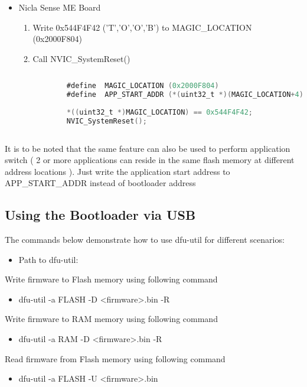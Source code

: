 \documentclass{article}
\begin{document}
\begin{itemize}
	\item Nicla Sense ME Board
	\begin{enumerate}[label=\roman*.]
		\item Write 0x544F4F42 ('T','O','O','B') to MAGIC\_LOCATION (0x2000F804)
		\item Call NVIC\_SystemReset()
		\begin{lstlisting}[language=C]
		
		#define  MAGIC_LOCATION (0x2000F804)
		#define  APP_START_ADDR (*(uint32_t *)(MAGIC_LOCATION+4)
		 
		*((uint32_t *)MAGIC_LOCATION) == 0x544F4F42;
		NVIC_SystemReset();
		
		\end{lstlisting}
	\end{enumerate}
\end{itemize}
It is to be noted that the same feature can also be used to perform application switch ( 2 or more applications can reside in the same flash memory at different address locations ). Just write the application start address to APP\_START\_ADDR instead of bootloader address
\subsection{Using the Bootloader via USB}
The commands below demonstrate how to use dfu-util for different scenarios:

\begin{itemize}
	\item Path to dfu-util: 
\end{itemize}

Write firmware to Flash memory using following command
\begin{itemize}
	\item dfu-util -a FLASH -D <firmware>.bin -R
\end{itemize}

Write firmware to RAM memory using following command
\begin{itemize}
	\item dfu-util -a RAM -D <firmware>.bin -R
\end{itemize}

Read firmware from Flash memory using following command
\begin{itemize}
	\item dfu-util -a FLASH -U <firmware>.bin
\end{itemize}
\end{document}
